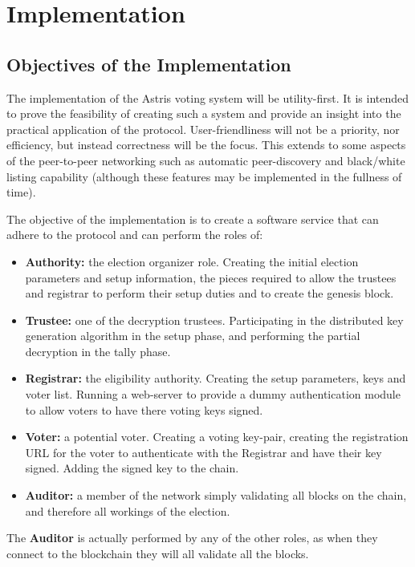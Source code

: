 
\chapter{Implementation}
\label{ch:sw}

\section{Objectives of the Implementation}
\label{ch:sw:objectives}

The implementation of the Astris voting system will be utility-first. It is intended to prove the feasibility of creating such a system and provide an insight into the practical application of the protocol. User-friendliness will not be a priority, nor efficiency, but instead correctness will be the focus. This extends to some aspects of the peer-to-peer networking such as automatic peer-discovery and black/white listing capability (although these features may be implemented in the fullness of time).

The objective of the implementation is to create a software service that can adhere to the protocol and can perform the roles of:

\begin{itemize}
    \item \textbf{Authority:} the election organizer role. Creating the initial election parameters and setup information, the pieces required to allow the trustees and registrar to perform their setup duties and to create the genesis block.
    \item \textbf{Trustee:} one of the decryption trustees. Participating in the distributed key generation algorithm in the setup phase, and performing the partial decryption in the tally phase.
    \item \textbf{Registrar:} the eligibility authority. Creating the setup parameters, keys and voter list. Running a web-server to provide a dummy authentication module to allow voters to have there voting keys signed.
    \item \textbf{Voter:} a potential voter. Creating a voting key-pair, creating the registration URL for the voter to authenticate with the Registrar and have their key signed. Adding the signed key to the chain.
    \item \textbf{Auditor:} a member of the network simply validating all blocks on the chain, and therefore all workings of the election.
\end{itemize}

The \textbf{Auditor} is actually performed by any of the other roles, as when they connect to the blockchain they will all validate all the blocks.

